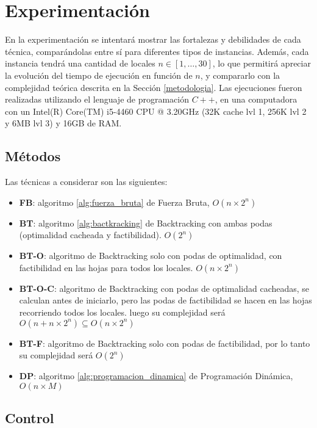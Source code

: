 \section{Experimentación}

En la experimentación se intentará mostrar las fortalezas y debilidades de cada técnica, comparándolas entre sí para diferentes tipos de instancias. Además, cada instancia tendrá una cantidad de locales $n \in [1,\dots,30]$, lo que permitirá apreciar la evolución del tiempo de ejecución en función de $n$, y compararlo con la complejidad teórica descrita en la Sección \ref{metodologia}. Las ejecuciones fueron realizadas utilizando el lenguaje de programación $C++$, en una computadora con un Intel(R) Core(TM) i5-4460 CPU @ 3.20GHz (32K cache lvl 1, 256K lvl 2 y 6MB lvl 3) y 16GB de RAM.

\subsection{Métodos}

Las técnicas a considerar son las siguientes:

\begin{itemize}
    \itemsep 0em 
    \item \textbf{FB}: algoritmo \ref{alg:fuerza_bruta} de Fuerza Bruta, $O(n \times 2^n)$
    \item \textbf{BT}: algoritmo \ref{alg:bactkracking} de Backtracking con ambas podas (optimalidad cacheada y factibilidad). $O(2^n)$
    \item \textbf{BT-O}: algoritmo de Backtracking solo con podas de optimalidad, con factibilidad en las hojas para todos los locales. $O(n\times2^n)$
    \item \textbf{BT-O-C}: algoritmo de Backtracking con podas de optimalidad cacheadas, se calculan antes de iniciarlo, pero las podas de factibilidad se hacen en las hojas recorriendo todos los locales. luego su complejidad será $O(n + n\times2^n) \subseteq O(n\times2^n)$
    \item \textbf{BT-F}: algoritmo de Backtracking solo con podas de factibilidad, por lo tanto su complejidad será $O(2^n)$
    \item \textbf{DP}: algoritmo \ref{alg:programacion_dinamica} de Programación Dinámica, $O(n\times M)$
\end{itemize}

\subsection{Control}

